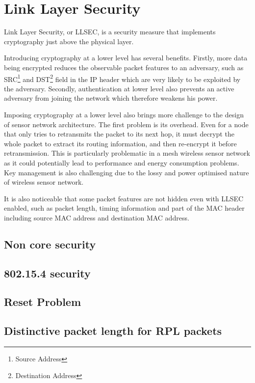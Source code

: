 \chapter{Link Layer Security}

Link Layer Security, or LLSEC, is a security measure that implements cryptography just above the physical layer.

Introducing cryptography at a lower level has several benefits. Firstly, more data being encrypted reduces the observable packet features to an adversary, such as SRC\footnote{Source Address} and DST\footnote{Destination Address} field in the IP header which are very likely to be exploited by the adversary. Secondly, authentication at lower level also prevents an active adversary from joining the network which therefore weakens his power. 

Imposing cryptography at a lower level also brings more challenge to the design of sensor network architecture. The first problem is its overhead. Even for a node that only tries to retransmits the packet to its next hop, it must decrypt the whole packet to extract its routing information, and then re-encrypt it before retransmission. This is particularly problematic in a mesh wireless sensor network as it could potentially lead to performance and energy consumption problems. Key management is also challenging due to the lossy and power optimised nature of wireless sensor network.

It is also noticeable that some packet features are not hidden even with LLSEC enabled, such as packet length, timing information and part of the MAC header including source MAC address and destination MAC address.

\section{Non core security} \label{sec: noncoresec}

\section{802.15.4 security}

\section{Reset Problem}

\section{Distinctive packet length for RPL packets}
